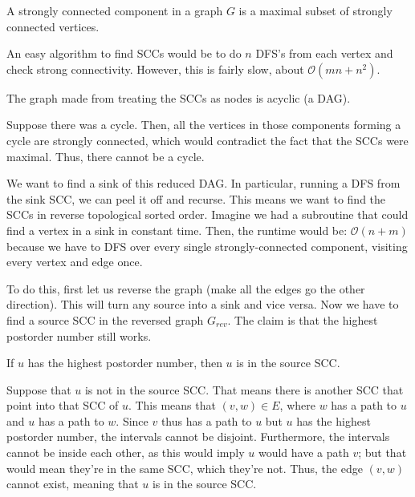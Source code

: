 \begin{definition} 
    A strongly connected component in a graph $G$ is a maximal subset of strongly connected vertices.
\end{definition}


An easy algorithm to find SCCs would be to do $n$ DFS's from each vertex and check strong connectivity. However, this is fairly slow,
about $\mathcal{O}(mn + n^2)$.

\begin{theorem} 
    The graph made from treating the SCCs as nodes is acyclic (a DAG).

    \begin{proof*}
        Suppose there was a cycle. Then, all the vertices in those components forming a cycle are strongly connected,
        which would contradict the fact that the SCCs were maximal. Thus, there cannot be a cycle.
    \end{proof*}
\end{theorem}

We want to find a sink of this reduced DAG. In particular, running a DFS from the sink SCC, we can peel it off and recurse.
This means we want to find the SCCs in reverse topological sorted order. Imagine we had a subroutine that could find a vertex in a sink in constant time. Then, the runtime would be:
$\mathcal{O}(n + m)$ because we have to DFS over every single strongly-connected component, visiting every vertex and edge once.

To do this, first let us reverse the graph (make all the edges go the other direction). This will turn any source into a sink and vice versa.
Now we have to find a source SCC in the reversed graph $G_{rev}$. The claim is that the highest postorder number still works.

\begin{theorem}
    If $u$ has the highest postorder number, then $u$ is in the source SCC.

    \begin{proof*}
        Suppose that $u$ is not in the source SCC. That means there is another SCC that point into that SCC of $u$. This means that $(v, w) \in E$,
        where $w$ has a path to $u$ and $u$ has a path to $w$. Since $v$ thus has a path to $u$ but $u$ has the highest postorder number, the intervals cannot be disjoint.
        Furthermore, the intervals cannot be inside each other, as this would imply $u$ would have a path $v$; but that would mean they're in the same SCC, which they're not.
        Thus, the edge $(v, w)$ cannot exist, meaning that $u$ is in the source SCC.
    \end{proof*}
\end{theorem}

